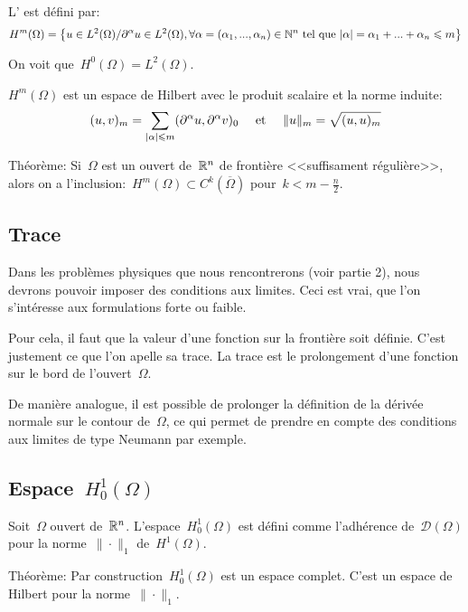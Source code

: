 L' est défini par:
\[
H^m(\Omega)=\left\{u\in L^2(\Omega)/ \partial^\alpha u\in L^2(\Omega),
\forall\alpha=(\alpha_1, ..., \alpha_n)\in\mathbb N^n \text{ tel que } |\alpha|=\alpha_1+...+\alpha_n\leqslant m
\right\}
\]

On voit que~$H^0(\Omega)=L^2(\Omega)$.

\medskip
$H^m(\Omega)$ est un espace de Hilbert avec le produit scalaire et la norme induite:
\[
(u,v)_m=\displaystyle\sum_{|\alpha|\leqslant m}(\partial^\alpha u,\partial^\alpha v)_0 
\quad \text{ et } \quad
\|u\|_m=\sqrt{(u,u)_m}
\]

Théorème: Si~$\Omega$ est un ouvert de~$\mathbb R^n$ de frontière <<suffisament
régulière>>, alors on a l'inclusion:~$H^m(\Omega)\subset C^k(\overline{\Omega})$
pour~$k<m-\frac{n}2$.

\medskip
\subsection*{Trace}

Dans les problèmes physiques que nous rencontrerons (voir partie 2), nous devrons
pouvoir imposer des conditions aux limites.
Ceci est vrai, que l'on s'intéresse aux formulations forte ou faible.

Pour cela, il faut que la valeur d'une fonction sur la frontière soit définie.
C'est justement ce que l'on apelle sa trace. 
La trace est le prolongement d'une fonction sur le bord de l'ouvert~$\Omega$.

De manière analogue, il est possible de prolonger la définition de la dérivée normale
sur le contour de~$\Omega$, ce qui permet de prendre en compte des conditions
aux limites de type Neumann par exemple.


\medskip
\subsection*{Espace~$H^1_0(\Omega)$}

Soit~$\Omega$ ouvert de~$\mathbb R^n$. 
L'espace~$H^1_0(\Omega)$ est défini comme l'adhérence de~$\mathcal{D}(\Omega)$
pour la norme~$\|\cdot\|_ 1$ de~$H^1(\Omega)$.

\medskip
Théorème: Par construction~$H^1_0(\Omega)$ est un espace complet. 
C'est un espace de Hilbert pour la norme~$\|\cdot\|_ 1$.

